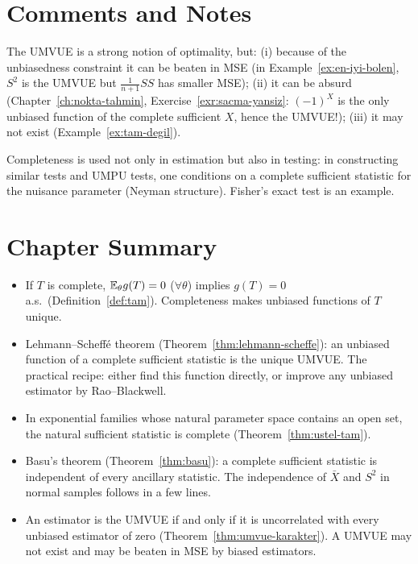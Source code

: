 \documentclass[main.tex]{subfiles}
\begin{document}
\section{Comments and Notes}

\begin{remark}
The UMVUE is a strong notion of optimality, but: (i) because of the unbiasedness constraint it can be beaten in MSE (in Example~\ref{ex:en-iyi-bolen}, $S^2$ is the UMVUE but $\frac{1}{n+1}SS$ has smaller MSE); (ii) it can be absurd (Chapter~\ref{ch:nokta-tahmin}, Exercise~\ref{exr:sacma-yansiz}: $(-1)^X$ is the only unbiased function of the complete sufficient $X$, hence the UMVUE!); (iii) it may not exist (Example~\ref{ex:tam-degil}).
\end{remark}

\begin{remark}
Completeness is used not only in estimation but also in testing: in constructing similar tests and UMPU tests, one conditions on a complete sufficient statistic for the nuisance parameter (Neyman structure). Fisher's exact test is an example.
\end{remark}

\section{Chapter Summary}
\begin{summary}
\begin{itemize}
  \item If $T$ is complete, $\mathbb{E}_\theta g(T)=0$ ($\forall\theta$) implies $g(T)=0$ a.s.\ (Definition~\ref{def:tam}). Completeness makes unbiased functions of $T$ unique.
  \item Lehmann--Scheffé theorem (Theorem~\ref{thm:lehmann-scheffe}): an unbiased function of a complete sufficient statistic is the unique UMVUE. The practical recipe: either find this function directly, or improve any unbiased estimator by Rao--Blackwell.
  \item In exponential families whose natural parameter space contains an open set, the natural sufficient statistic is complete (Theorem~\ref{thm:ustel-tam}).
  \item Basu's theorem (Theorem~\ref{thm:basu}): a complete sufficient statistic is independent of every ancillary statistic. The independence of $\bar X$ and $S^2$ in normal samples follows in a few lines.
  \item An estimator is the UMVUE if and only if it is uncorrelated with every unbiased estimator of zero (Theorem~\ref{thm:umvue-karakter}). A UMVUE may not exist and may be beaten in MSE by biased estimators.
\end{itemize}
\end{summary}
\end{document}

